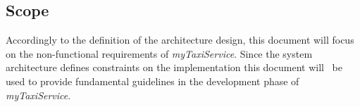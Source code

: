 \documentclass[a4paper,11pt]{report} %
\newcommand{\mts}{\mbox{\normalfont\itshape myTaxiService}}
\begin{document}
	\subsection{Scope} Accordingly to the definition of the architecture design, this document will focus on the non-functional requirements of \mts{}. 
	Since the system architecture  defines constraints on the implementation this document will  be  used to provide fundamental guidelines in the development phase of \mts{}.
	
\end{document}
